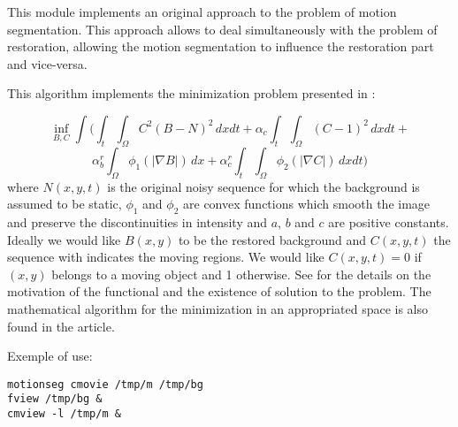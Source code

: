 This module implements an original approach to the problem of motion segmentation.
This approach  allows to deal simultaneously with the problem of restoration, allowing
the motion segmentation to influence the restoration part and vice-versa.

This algorithm implements the minimization problem presented in \cite{aubert.deriche.ea:seq}:

$$
\inf_{B,C} \int ( \int_t \int_\Omega C^2(B-N)^2 \, dx dt + \alpha_c \int_t \int_\Omega
(C-1)^2 \, dx dt +
$$
$$\alpha_b^r \int_\Omega \phi_1 (|\nabla B|) \, dx + \alpha_c^r \int_t \int_\Omega
\phi_2 (|\nabla C|) \, dx dt )
$$
where $N(x,y,t)$ is the original noisy sequence for which the background is assumed to be static, $\phi_1$ and $\phi_2$  are convex functions which smooth the image and preserve the discontinuities in intensity and $a$, $b$ and $c$ are positive constants.
Ideally we would like $B(x,y)$ to be the restored background and $C(x,y,t)$ the sequence with indicates the moving regions. We would like $C(x,y,t)=0$ if $(x,y)$ belongs to a moving object and 1 otherwise.
See \cite{aubert.deriche.ea:seq} for the details on the motivation of the functional and the existence of solution to the problem. The mathematical algorithm for the minimization in an appropriated space is also found in the article.

\medskip

Exemple of use:
\begin{verbatim}
motionseg cmovie /tmp/m /tmp/bg
fview /tmp/bg &
cmview -l /tmp/m &
\end{verbatim}

